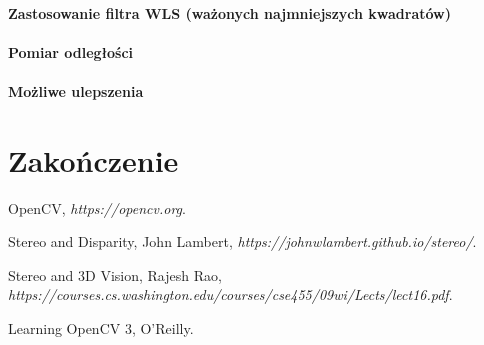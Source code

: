 \documentclass[magisterska]{pracadypl}
\begin{document}
\subsubsection{Zastosowanie filtra WLS (ważonych najmniejszych kwadratów)}
\subsubsection{Pomiar odległości}
\subsubsection{Możliwe ulepszenia}

\chapter{Zakończenie}

\begin{thebibliography}{7}

OpenCV, 
\textit{https://opencv.org}.

Stereo and Disparity, John Lambert,  
\textit{https://johnwlambert.github.io/stereo/}.

Stereo and 3D Vision, Rajesh Rao, 
\textit{https://courses.cs.washington.edu/courses/cse455/09wi/Lects/lect16.pdf}.

Learning OpenCV 3, O'Reilly. 

\end{thebibliography}
\end{document}
